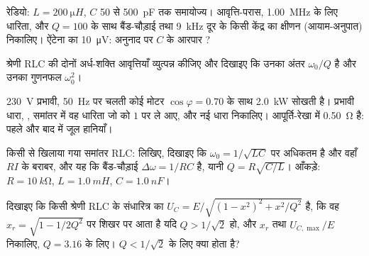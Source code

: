\begin{exercise}[$\star\star$]\label{exo:b1:sinusoidal-impedance:7}
रेडियो: $L = \qty{200}{\micro H}$, $C$ \qty{50}{} से
\qty{500}{pF} तक समायोज्य। आवृत्ति-परास, \qty{1.00}{MHz} के लिए धारिता,
और $Q = 100$ के साथ बैंड-चौड़ाई तथा \qty{9}{kHz} दूर के किसी केंद्र का क्षीणन
(आयाम-अनुपात) निकालिए। ऐंटेना का 
\qty{10}{\micro V}: अनुनाद पर $C$ के आरपार ?
\end{exercise}

\begin{exercise}[$\star\star$]\label{exo:b1:sinusoidal-impedance:8}
श्रेणी RLC की दोनों अर्ध-शक्ति आवृत्तियाँ व्युत्पन्न कीजिए और दिखाइए कि
उनका अंतर $\omega_0/Q$ है और उनका गुणनफल $\omega_0^2$।
\end{exercise}

\begin{exercise}[$\star\star$]\label{exo:b1:sinusoidal-impedance:9}
\qty{230}{V} प्रभावी, \qty{50}{Hz} पर चलती कोई मोटर $\cos\varphi = 0.70$ के साथ
\qty{2.0}{kW} सोखती है। प्रभावी धारा, , समांतर में वह
धारिता जो  को $1$ पर ले आए, और नई धारा निकालिए।
आपूर्ति-रेखा में \qty{0.50}{\ohm} है: पहले और बाद में जूल हानियाँ।
\end{exercise}

\begin{exercise}[$\star\star\star$]\label{exo:b1:sinusoidal-impedance:10}
किसी  से खिलाया गया समांतर RLC:  लिखिए, दिखाइए कि
 $\omega_0 = 1/\sqrt{LC}$ पर अधिकतम है और वहाँ $RI$ के बराबर,
और यह कि बैंड-चौड़ाई $\Delta\omega = 1/RC$ है, यानी $Q =
R\sqrt{C/L}$। आँकड़े: $R = \qty{10}{k\ohm}$, $L = \qty{1.0}{mH}$,
$C = \qty{1.0}{nF}$।
\end{exercise}

\begin{exercise}[$\star\star\star$]\label{exo:b1:sinusoidal-impedance:11}
दिखाइए कि किसी श्रेणी RLC के संधारित्र का  $U_C = E/\sqrt{(1 -
x^2)^2 + x^2/Q^2}$ है, कि वह $x_r = \sqrt{1 - 1/2Q^2}$ पर शिखर पर आता है यदि
$Q > 1/\sqrt2$ हो, और $x_r$ तथा $U_{C,\max}/E$ निकालिए, $Q = 3.16$ के लिए।
$Q < 1/\sqrt2$ के लिए क्या होता है?
\end{exercise}


